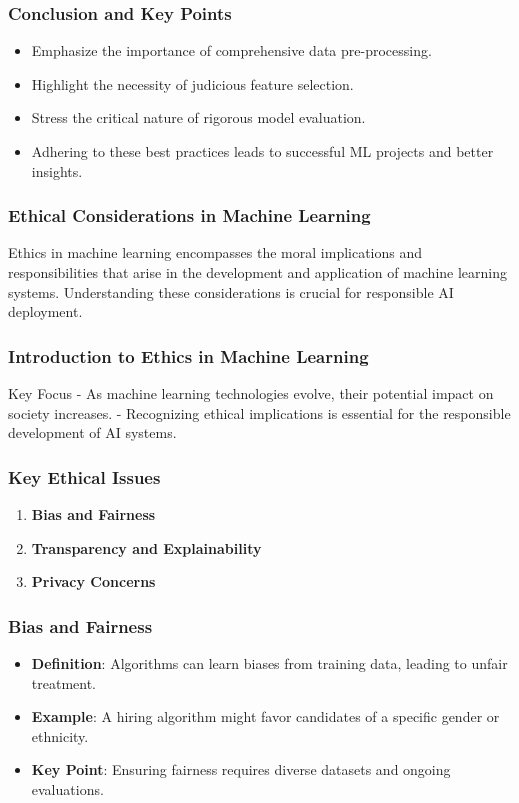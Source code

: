 \documentclass[aspectratio=169]{beamer}
\begin{document}
\begin{frame}[fragile]
    \frametitle{Conclusion and Key Points}
    \begin{itemize}
        \item Emphasize the importance of comprehensive data pre-processing.
        \item Highlight the necessity of judicious feature selection.
        \item Stress the critical nature of rigorous model evaluation.
        \item Adhering to these best practices leads to successful ML projects and better insights.
    \end{itemize}
\end{frame}

\begin{frame}[fragile]
  \frametitle{Ethical Considerations in Machine Learning}
  Ethics in machine learning encompasses the moral implications and responsibilities that arise in the development and application of machine learning systems. Understanding these considerations is crucial for responsible AI deployment.
\end{frame}

\begin{frame}[fragile]
  \frametitle{Introduction to Ethics in Machine Learning}
  \begin{block}{Key Focus}
    - As machine learning technologies evolve, their potential impact on society increases.
    - Recognizing ethical implications is essential for the responsible development of AI systems.
  \end{block}
\end{frame}

\begin{frame}[fragile]
  \frametitle{Key Ethical Issues}
  \begin{enumerate}
    \item \textbf{Bias and Fairness}
    \item \textbf{Transparency and Explainability}
    \item \textbf{Privacy Concerns}
  \end{enumerate}
\end{frame}

\begin{frame}[fragile]
  \frametitle{Bias and Fairness}
  \begin{itemize}
    \item \textbf{Definition}: Algorithms can learn biases from training data, leading to unfair treatment.
    \item \textbf{Example}: A hiring algorithm might favor candidates of a specific gender or ethnicity.
    \item \textbf{Key Point}: Ensuring fairness requires diverse datasets and ongoing evaluations.
  \end{itemize}
\end{frame}
\end{document}
